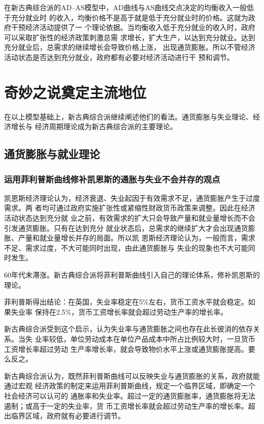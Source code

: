 在新古典综合派的AD--AS模型中，AD曲线与AS曲线交点决定的均衡收入一般低于充分就业时
的收入，均衡价格不是高于就是低于充分就业时的价格。这就为政府干预经济活动提供了一
个理论依据。当均衡收入低于充分就业的收入时，政府可以采取扩张性的经济政策刺激总需
求增长，扩大生产，以达到充分就业。达到充分就业后，总需求的继续增长会导致价格上涨，
出现通货膨胀。所以不管经济活动状态是否达到充分就业，政府都有必要对经济活动进行干
预和调节。

\section{奇妙之说奠定主流地位}

在以上模型基础上，新古典综合派继续阐述他们的看法。通货膨胀与失业理论、经济增长与
经济周期理论成为新古典综合派的主要理论。

\subsection{通货膨胀与就业理论}

\subsubsection{运用菲利普斯曲线修补凯恩斯的通胀与失业不会并存的观点}

凯恩斯经济理论认为，经济衰退、失业起因于有效需求不足，通货膨胀产生于过度需求。两
者均可通过政府实施扩张性或紧缩性财政货币政策来调整。因此在经济活动状态达到充分就
业之前，有效需求的扩大只会导致产量和就业量增长而不会引发通货膨胀。只有在达到充分
就业状态后，总需求的继续扩大才会出现通货膨胀、产量和就业量增长并存的局面。所以凯
恩斯经济理论认为，一般而言，需求不足、需求过度，不大可能同时出现，由此通货膨胀与
失业的现象也不大可能同时发生。

60年代末滞涨。新古典综合派将菲利普斯曲线引入自己的理论体系，修补凯恩斯的理论。

菲利普斯得出结论：在英国，失业率稳定在5\%左右，货币工资水平就会稳定。如果失业率
保持在2.5\%，货币工资增长率就会超过劳动生产率的增长率。

新古典综合派受到这个启示，认为失业率与通货膨胀之间也存在此长彼消的依存关系。当失
业率较低，单位劳动成本在单位产品成本中所占比例较大时，一旦货币工资增长率超过劳动
生产率增长率，就会导致物价水平上涨或通货膨胀提高。要么反之。

新古典综合派认为，既然菲利普斯曲线可以反映失业与通货膨胀的关系，政府就能通过宏观
经济政策的制定来运用菲利普斯曲线，规定一个临界区域，即确定一个社会经济可以认可的
通胀率和失业率。超过一定的通货膨胀率，通货膨胀将无法遏制；或高于一定的失业率，货
币工资增长率就会超过劳动生产率的增长率。超出临界区域，政府就有必要进行调节。

